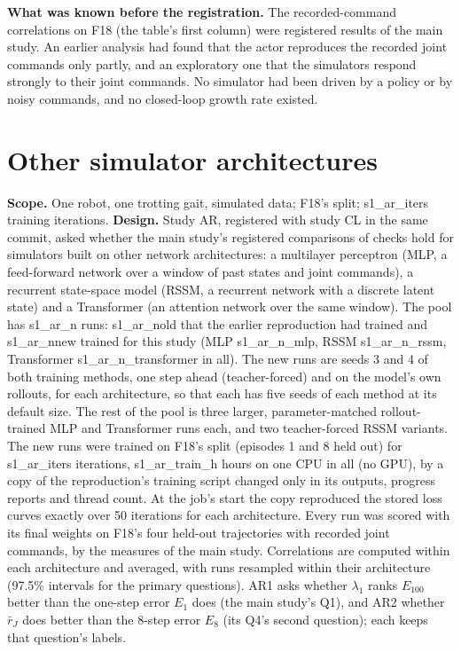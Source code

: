 \textbf{What was known before the registration.} The recorded-command correlations on F18 (the table's first column)
were registered results of the main study. An earlier analysis had found that the actor reproduces the recorded joint
commands only partly, and an exploratory one that the simulators respond strongly to their joint commands. No
simulator had been driven by a policy or by noisy commands, and no closed-loop growth rate existed.

\FloatBarrier
\section{Other simulator architectures}\label{app:A9}
\textbf{Scope.} One robot, one trotting gait, simulated data; F18's split; {{s1_ar_iters}} training iterations.
\textbf{Design.} Study AR, registered with study CL in the same commit, asked whether the main study's registered
comparisons of checks hold for simulators built on other network architectures: a multilayer perceptron (MLP, a
feed-forward network over a window of past states and joint commands), a recurrent state-space model (RSSM, a
recurrent network with a discrete latent state) and a Transformer (an attention network over the same window). The
pool has {{s1_ar_n}} runs: {{s1_ar_nold}} that the earlier reproduction had trained and {{s1_ar_nnew}} trained for
this study (MLP {{s1_ar_n_mlp}}, RSSM {{s1_ar_n_rssm}}, Transformer {{s1_ar_n_transformer}} in all). The new runs
are seeds 3 and 4 of both training methods, one step ahead (teacher-forced) and on the model's own rollouts, for each
architecture, so that each has five seeds of each method at its default size. The rest of the pool is three larger,
parameter-matched rollout-trained MLP and Transformer runs each, and two teacher-forced RSSM variants. The new runs
were trained on F18's split (episodes 1 and 8 held out) for {{s1_ar_iters}} iterations, {{s1_ar_train_h}} hours on
one CPU in all (no GPU), by a copy of the reproduction's training script changed only in its outputs, progress reports and
thread count.
At the job's start the copy reproduced the stored loss curves exactly over 50 iterations for each architecture.
Every run was scored with its final weights on F18's four held-out trajectories with recorded joint commands, by the
measures of the main study. Correlations are computed within each architecture and averaged, with runs resampled
within their architecture (97.5\% intervals for the primary questions). AR1 asks whether $\lambda_1$ ranks $E_{100}$
better than the one-step error $E_1$ does (the main study's Q1), and AR2 whether $\bar r_J$ does better than the 8-step
error $E_8$ (its Q4's second question); each keeps that question's labels.


